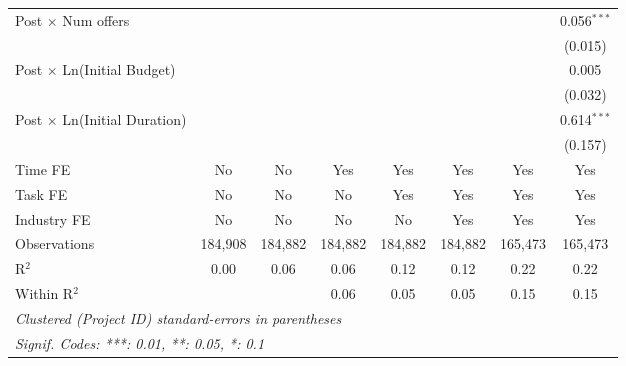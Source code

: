 \documentclass[
]{article}
\begin{document}
\begin{tabular}{lccccccc}
   Post $\times$ Num offers                             &                &                &                &                &               &                & 0.056$^{***}$\\   
                                                        &                &                &                &                &               &                & (0.015)\\   
   Post $\times$ Ln(Initial Budget)                     &                &                &                &                &               &                & 0.005\\   
                                                        &                &                &                &                &               &                & (0.032)\\   
   Post $\times$ Ln(Initial Duration)                   &                &                &                &                &               &                & 0.614$^{***}$\\   
                                                        &                &                &                &                &               &                & (0.157)\\   
   Time FE                                              & No             & No             & Yes            & Yes            & Yes           & Yes            & Yes\\  
   Task FE                                              & No             & No             & No             & Yes            & Yes           & Yes            & Yes\\  
   Industry FE                                          & No             & No             & No             & No             & Yes           & Yes            & Yes\\  
   Observations                                         & 184,908        & 184,882        & 184,882        & 184,882        & 184,882       & 165,473        & 165,473\\  
   R$^2$                                                & 0.00           & 0.06           & 0.06           & 0.12           & 0.12          & 0.22           & 0.22\\  
   Within R$^2$                                         &                &                & 0.06           & 0.05           & 0.05          & 0.15           & 0.15\\  
   \midrule
   \multicolumn{8}{l}{\emph{Clustered (Project ID) standard-errors in parentheses}}\\
   \multicolumn{8}{l}{\emph{Signif. Codes: ***: 0.01, **: 0.05, *: 0.1}}\\
\end{tabular}
\par\endgroup
\end{document}
